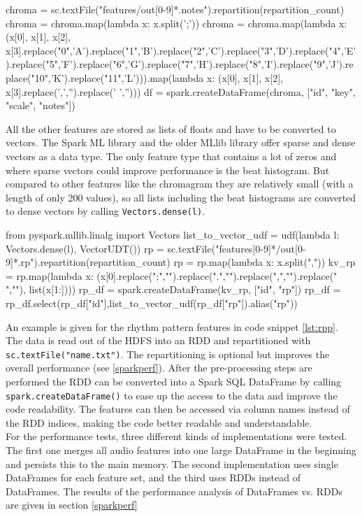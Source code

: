 \begin{pythonCode}[frame=single,label={lst:prep1},caption={notes preprocessing},captionpos=b]
chroma = sc.textFile("features/out[0-9]*.notes").repartition(repartition_count)
chroma = chroma.map(lambda x: x.split(';'))
chroma = chroma.map(lambda x: (x[0], x[1], x[2], x[3].replace("0",'A').replace("1",'B').replace("2",'C').replace("3",'D').replace("4",'E').replace("5",'F').replace("6",'G').replace("7",'H').replace("8",'I').replace("9",'J').replace("10",'K').replace("11",'L'))).map(lambda x: (x[0], x[1], x[2], x[3].replace(',','').replace(' ','')))
df = spark.createDataFrame(chroma, ["id", "key", "scale", "notes"])
\end{pythonCode}

\noindent All the other features are stored as lists of floats and have to be converted to vectors. The Spark ML library and the older MLlib library offer sparse and dense vectors as a data type. The only feature type that contains a lot of zeros and where sparse vectors could improve performance is the beat histogram. But compared to other features like the chromagram they are relatively small (with a length of only 200 values), so all lists including the beat histograms are converted to dense vectors by calling \lstinline{Vectors.dense(l)}. 

\begin{pythonCode}[frame=single,label={lst:rpp},caption={rp preprocessing},captionpos=b]
from pyspark.mllib.linalg import Vectors
list_to_vector_udf = udf(lambda l: Vectors.dense(l), VectorUDT())
rp = sc.textFile("features[0-9]*/out[0-9]*.rp").repartition(repartition_count)
rp = rp.map(lambda x: x.split(","))
kv_rp = rp.map(lambda x: (x[0].replace(";","").replace(".","").replace(",","").replace(" ",""), list(x[1:])))
rp_df = spark.createDataFrame(kv_rp, ["id", "rp"])
rp_df = rp_df.select(rp_df["id"],list_to_vector_udf(rp_df["rp"]).alias("rp"))
\end{pythonCode}

\noindent An example is given for the rhythm pattern features in code snippet \ref{lst:rpp}. The data is read out of the HDFS into an RDD and repartitioned with \lstinline{sc.textFile("name.txt")}. The repartitioning is optional but improves the overall performance (see \ref{sparkperf}). After the pre-processing steps are performed the RDD can be converted into a Spark SQL DataFrame by calling \lstinline{spark.createDataFrame()} to ease up the access to the data and improve the code readability. The features can then be accessed via column names instead of the RDD indices, making the code better readable and understandable.\\
For the performance tests, three different kinds of implementations were tested. The first one merges all audio features into one large DataFrame in the beginning and persists this to the main memory. The second implementation uses single DataFrames for each feature set, and the third uses RDDs instead of DataFrames. The results of the performance analysis of DataFrames vs. RDDs are given in section \ref{sparkperf}

